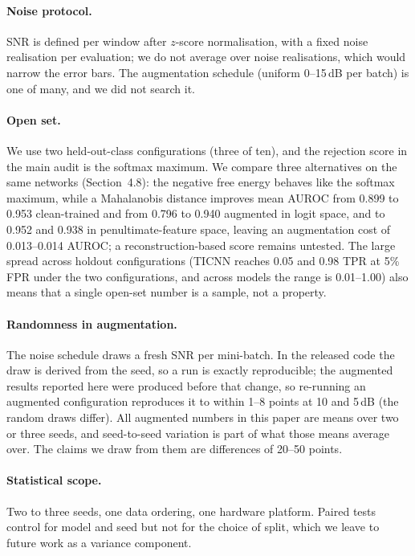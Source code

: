 \paragraph{Noise protocol.} SNR is defined per window after $z$-score normalisation, with a fixed noise realisation per evaluation; we do not average over noise realisations, which would narrow the error bars. The augmentation schedule (uniform 0--15\,dB per batch) is one of many, and we did not search it.

\paragraph{Open set.} We use two held-out-class configurations (three of ten), and the rejection score in the main audit is the softmax maximum. We compare three alternatives on the same networks (Section~4.8): the negative free energy behaves like the softmax maximum, while a Mahalanobis distance improves mean AUROC from 0.899 to 0.953 clean-trained and from 0.796 to 0.940 augmented in logit space, and to 0.952 and 0.938 in penultimate-feature space, leaving an augmentation cost of 0.013--0.014 AUROC; a reconstruction-based score remains untested. The large spread across holdout configurations (TICNN reaches 0.05 and 0.98 TPR at 5\% FPR under the two configurations, and across models the range is 0.01--1.00) also means that a single open-set number is a sample, not a property.

\paragraph{Randomness in augmentation.} The noise schedule draws a fresh SNR per mini-batch. In the released code the draw is derived from the seed, so a run is exactly reproducible; the augmented results reported here were produced before that change, so re-running an augmented configuration reproduces it to within 1--8 points at 10 and 5\,dB (the random draws differ). All augmented numbers in this paper are means over two or three seeds, and seed-to-seed variation is part of what those means average over. The claims we draw from them are differences of 20--50 points.

\paragraph{Statistical scope.} Two to three seeds, one data ordering, one hardware platform. Paired tests control for model and seed but not for the choice of split, which we leave to future work as a variance component.

